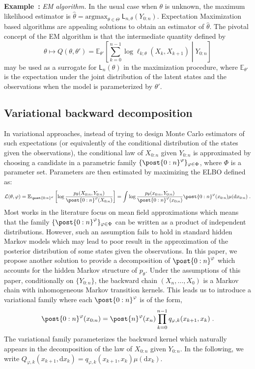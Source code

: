 \documentclass{article}
\newcommand{\1}{\mathbbm{1}}
\newcommand{\llh}[1]{\mathsf{L}_{#1}}
\newcommand{\parvec}{\theta}
\newcommand{\parspace}{\Theta}
\def\pE{\mathbb{E}}
\newcommand{\rmd}{\ensuremath{\mathrm{d}}}
\newcommand{\eqsp}{\;}
\newcommand{\qg}[1]{\ell_{#1}}
\newcounter{example}[section]
\newenvironment{example}[1][]{\refstepcounter{example}\par\medskip
   \noindent \textbf{Example~\theexample:} \textit{#1} \text \rmfamily}{\medskip}
\begin{document}
\begin{example}[EM algorithm.]
\label{ex:em:algorithm}
In the usual case when $\theta$ is unknown, the maximum likelihood estimator is $\widehat \parvec = \mathrm{argmax}_{\parvec\in\parspace}\eqsp\llh{n,\parvec}(Y_{0:n})$. Expectation Maximization based algorithms are appealing solutions to obtain an estimator of $\hat \parvec$.
The pivotal concept of the EM algorithm is that the intermediate quantity defined by
\begin{equation*}
\parvec\mapsto Q(\parvec,\parvec') = \pE_{\parvec'}\left[\sum_{k=0}^{n-1} \log \qg{k;\parvec}(X_{k}, X_{k+1})\middle | Y_{0:n}\right] 
\end{equation*}
may be used as a surrogate for $\llh{n}(\parvec)$ in the maximization procedure,  where $\pE_{\parvec'}$ is the expectation under the joint distribution of the latent states and the observations when the model is parameterized by $\parvec'$. 
\end{example}

\subsection{Variational backward decomposition}
In variational approaches, instead of trying to design Monte Carlo estimators of such expectations (or equivalently of the conditional distribution of the states given the observations), the conditional law of $X_{0:n}$ given $Y_{0:n}$ is approximated by choosing a candidate in a parametric family $\{ \post{0:n}^{\varphi}\}_{\varphi \in \Phi}$, where $\Phi$ is a parameter set. Parameters are then estimated by maximizing the ELBO defined as:
$$
\mathcal{L}(\parvec,\varphi) = \pE_{ \post{0:n}^{\varphi}}\left[\log \frac{p_\parvec(X_{0:n},Y_{0:n})}{ \post{0:n}^{\varphi}(X_{0:n})}\right] = \int \log \frac{p_\parvec(x_{0:n},Y_{0:n})}{ \post{0:n}^{\varphi}(x_{0:n})} \post{0:n}^{\varphi}(x_{0:n})\mu(\rmd x_{0:n})\eqsp.
$$
Most works in the literature focus on mean field approximations which means that the family $\{ \post{0:n}^{\varphi}\}_{\varphi \in \Phi}$ can be written as a product of independent distributions. However, such an assumption fails to hold in standard hidden Markov models which may lead to poor result in the approximation of the posterior distribution of some states given the observations. In this paper, we propose another solution to provide a decomposition of   $ \post{0:n}^{\varphi}$ which accounts for the hidden Markov structure of $p_\parvec$. Under the assumptions of this paper, conditionally on $\{Y_{0:n}\}$, the backward chain $(X_n,\ldots,X_0)$ is a Markov chain with inhomogeneous Markov transition kernels. This leads us to introduce a variational family where each $\post{0:n}^{\varphi}$ is of the form,
$$
 \post{0:n}^{\varphi}(x_{0:n})=  \post{n}^{\varphi}(x_n)\prod_{k=0}^{n-1}q_{\varphi,k}(x_{k+1},x_k)\eqsp.
$$
The variational family parameterizes the backward kernel which naturally appears in the decomposition of the law of $X_{0:n}$ given $Y_{0:n}$. In the following, we write $Q_{\varphi,k}(x_{k+1}, \rmd x_k) = q_{\varphi,k}(x_{k+1},x_k) \mu(\rmd x_k)$.
\end{document}
